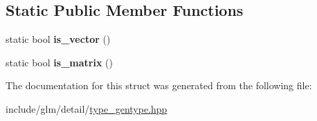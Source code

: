 \subsection*{Static Public Member Functions}
\begin{DoxyCompactItemize}
\item 
\mbox{\label{structglm_1_1detail_1_1genType_ae83087df55201bdc46a37decf3d1c34c}} 
static bool {\bfseries is\+\_\+vector} ()
\item 
\mbox{\label{structglm_1_1detail_1_1genType_a78c650375558d5e2ccfba383cdb59479}} 
static bool {\bfseries is\+\_\+matrix} ()
\end{DoxyCompactItemize}


The documentation for this struct was generated from the following file\+:\begin{DoxyCompactItemize}
\item 
include/glm/detail/\hyperlink{type__gentype_8hpp}{type\+\_\+gentype.\+hpp}\end{DoxyCompactItemize}

